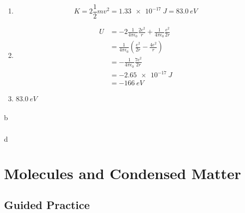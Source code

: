 \documentclass{article}
\begin{document}
\begin{enumerate}
  \item \[K = 2 \frac{1}{2} m v^2 = \qty{1.33e-17}{J} = \qty{83.0}{eV}\]

  \item

        \begin{align*}
          U & = -2 \frac{1}{4 \pi \epsilon_0} \frac{2 e^2}{r} + \frac{1}{4 \pi \epsilon_0} \frac{e^2}{2 r} \\
            & = \frac{1}{4 \pi \epsilon_0} \left( \frac{e^2}{2 r} - \frac{4 e^2}{r} \right)                \\
            & = -\frac{1}{4 \pi \epsilon_0} \frac{7 e^2}{2 r}                                              \\
            & = \qty{-2.65e-17}{J}                                                                         \\
            & = \qty{-166}{eV}
        \end{align*}

  \item $\qty{83.0}{eV}$
\end{enumerate}

\setcounter{subsubsection}{70}
\subsubsection{}

b

\setcounter{subsubsection}{72}
\subsubsection{}

d

\section{Molecules and Condensed Matter}

\subsection{Guided Practice}

\subsubsection{}
\end{document}
